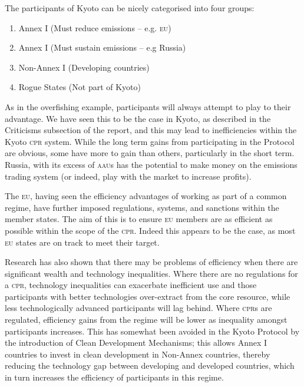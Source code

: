 The participants of Kyoto can be nicely categorised into four groups:
\begin{enumerate}
	\item Annex I (Must reduce emissions – e.g. \textsc{eu})
	\item Annex I (Must sustain emissions – e.g Russia)
	\item Non-Annex I (Developing countries)
	\item Rogue States (Not part of Kyoto)
\end{enumerate}

As in the overfishing example, participants will always attempt to play to their advantage. We have seen this to be the case in Kyoto, as described in the Criticisms subsection of the report, and this may lead to inefficiencies within the Kyoto \textsc{cpr} system. While the long term gains from participating in the Protocol are obvious, some have more to gain than others, particularly in the short term. Russia, with its excess of \textsc{aau}s has the potential to make money on the emissions trading system (or indeed, play with the market to increase profits).

The \textsc{eu}, having seen the efficiency advantages of working as part of a common regime, have further imposed regulations, systems, and sanctions within the member states. The aim of this is to ensure \textsc{eu} members are as efficient as possible within the scope of the \textsc{cpr}. Indeed this appears to be the case, as most \textsc{eu} states are on track to meet their target.~\cite{EEA-Tracking-progress-20}

Research has also shown that there may be problems of efficiency when there are significant wealth and technology inequalities. Where there are no regulations for a \textsc{cpr}, technology inequalities can exacerbate inefficient use and those participants with better technologies over-extract from the core resource, while less technologically advanced participants will lag behind. Where \textsc{cpr}s are regulated, efficiency gains from  the regime will be lower as inequality amongst participants increases. This has somewhat been avoided in the Kyoto Protocol by the introduction of Clean Development Mechanisms; this allows Annex I countries to invest in clean development in Non-Annex countries, thereby reducing the technology gap between developing and developed countries, which in turn increases the efficiency of participants in this regime.~\cite{Wealth-inequality-regulated}\cite{Wealth-inequality-unregulated}


